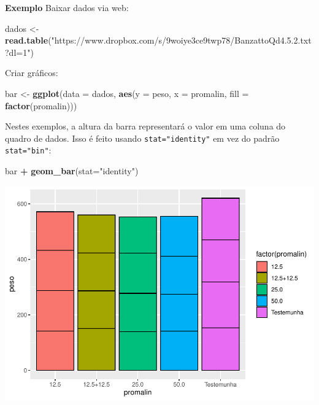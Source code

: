 \documentclass[
]{book}
\newenvironment{Shaded}{\begin{snugshade}}{\end{snugshade}}
\newcommand{\DataTypeTok}[1]{\textcolor[rgb]{0.13,0.29,0.53}{#1}}
\newcommand{\KeywordTok}[1]{\textcolor[rgb]{0.13,0.29,0.53}{\textbf{#1}}}
\newcommand{\NormalTok}[1]{#1}
\newcommand{\OperatorTok}[1]{\textcolor[rgb]{0.81,0.36,0.00}{\textbf{#1}}}
\newcommand{\StringTok}[1]{\textcolor[rgb]{0.31,0.60,0.02}{#1}}
\begin{document}
\textbf{Exemplo}
Baixar dados via web:

\begin{Shaded}
\begin{Highlighting}[]
\NormalTok{dados <-}\StringTok{ }\KeywordTok{read.table}\NormalTok{(}\StringTok{"https://www.dropbox.com/s/9woiye3ce9twp78/BanzattoQd4.5.2.txt?dl=1"}\NormalTok{)}
\end{Highlighting}
\end{Shaded}

Criar gráficos:

\begin{Shaded}
\begin{Highlighting}[]
\NormalTok{bar <-}\StringTok{ }\KeywordTok{ggplot}\NormalTok{(}\DataTypeTok{data =}\NormalTok{ dados, }\KeywordTok{aes}\NormalTok{(}\DataTypeTok{y =}\NormalTok{ peso, }\DataTypeTok{x =}\NormalTok{ promalin, }\DataTypeTok{fill =} \KeywordTok{factor}\NormalTok{(promalin)))}
\end{Highlighting}
\end{Shaded}

Nestes exemplos, a altura da barra representará o valor em uma coluna do quadro de dados. Isso é feito usando \texttt{stat="identity"} em vez do padrão \texttt{stat="bin"}:

\begin{Shaded}
\begin{Highlighting}[]
\NormalTok{bar }\OperatorTok{+}\StringTok{  }\KeywordTok{geom_bar}\NormalTok{(}\DataTypeTok{stat=}\StringTok{"identity"}\NormalTok{)}
\end{Highlighting}
\end{Shaded}

\includegraphics{TudodoR_files/figure-latex/unnamed-chunk-199-1.pdf}
\end{document}
